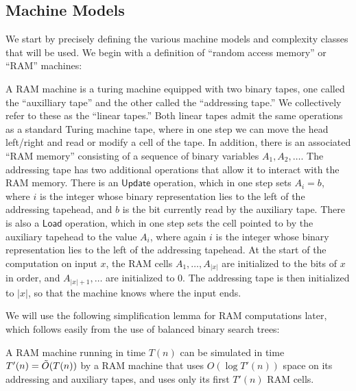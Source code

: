 \subsection{Machine Models}\label{lossy:subsec:machines}
We start by precisely defining the various machine models and complexity classes that will be used. We begin with a definition of ``random access memory'' or ``RAM'' machines:
\begin{definition}
A RAM machine is a turing machine equipped with two binary tapes, one called the ``auxilliary tape'' and the other called the ``addressing tape.'' We collectively refer to these as the ``linear tapes.'' Both linear tapes admit the same operations as a standard Turing machine tape, where in one step we can move the head left/right and read or modify a cell of the tape. In addition, there is an associated ``RAM memory'' consisting of a sequence of binary variables $A_1,A_2,\ldots$. The addressing tape has two additional operations that allow it to interact with the RAM memory. There is an $\mathsf{Update}$ operation, which in one step sets $A_i = b$, where $i$ is the integer whose binary representation lies to the left of the addressing tapehead, and $b$ is the bit currently read by the auxiliary tape. There is also a $\mathsf{Load}$ operation, which in one step sets the cell pointed to by the auxiliary tapehead to the value $A_i$, where again $i$ is the integer whose binary representation lies to the left of the addressing tapehead. At the start of the computation on input $x$, the RAM cells $A_1,\ldots,A_{|x|}$ are initialized to the bits of $x$ in order, and $A_{|x|+1}, \ldots$ are initialized to $0$. The addressing tape is then initialized to $|x|$, so that the machine knows where the input ends.
\end{definition}
We will use the following simplification lemma for RAM computations later, which follows easily from the use of balanced binary search trees:
\begin{lemma}\label{lossy:lem:ram-bst}\cite{NLT}
A RAM machine running in time $T(n)$ can be simulated in time $T'(n) = \Tilde{O}(T(n))$ by a RAM machine that uses $O(\log T'(n))$ space on its addressing and auxiliary tapes, and uses only its first $T'(n)$ RAM cells.
\end{lemma}

